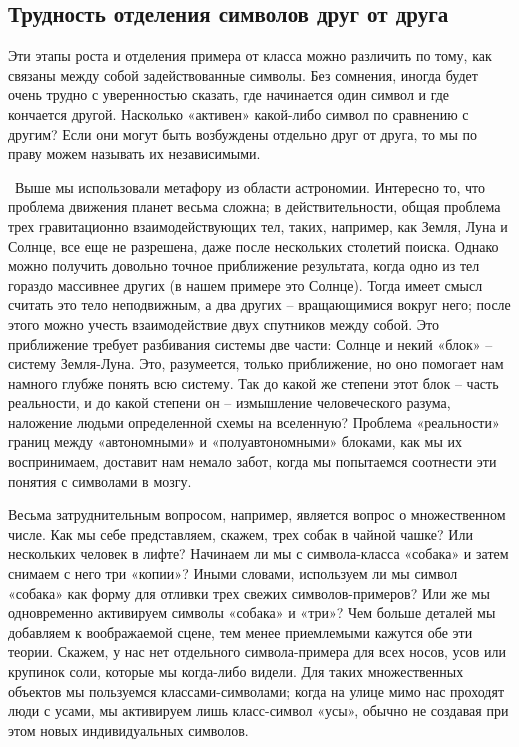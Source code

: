 \documentclass[../main.tex]{subfiles}
\begin{document}
\subsection{Трудность отделения символов друг от друга}

Эти этапы роста и отделения примера от класса можно различить по тому, как связаны между собой задействованные символы. Без сомнения, иногда будет очень трудно с уверенностью сказать, где начинается один символ и где кончается другой. Насколько «активен» какой-либо символ по сравнению с другим? Если они могут быть возбуждены отдельно друг от друга, то мы по праву можем называть их независимыми.

~Выше мы использовали метафору из области астрономии. Интересно то, что проблема движения планет весьма сложна; в действительности, общая проблема трех гравитационно взаимодействующих тел, таких, например, как Земля, Луна и Солнце, все еще не разрешена, даже после нескольких столетий поиска. Однако можно получить довольно точное приближение результата, когда одно из тел гораздо массивнее других (в нашем примере это Солнце). Тогда имеет смысл считать это тело неподвижным, а два других \--- вращающимися вокруг него; после этого можно учесть взаимодействие двух спутников между собой. Это приближение требует разбивания системы две части: Солнце и некий «блок» \--- систему Земля-Луна. Это, разумеется, только приближение, но оно помогает нам намного глубже понять всю систему. Так до какой же степени этот блок \--- часть реальности, и до какой степени он \--- измышление человеческого разума, наложение людьми определенной схемы на вселенную? Проблема «реальности» границ между «автономными» и «полуавтономными» блоками, как мы их воспринимаем, доставит нам немало забот, когда мы попытаемся соотнести эти понятия с символами в мозгу.

Весьма затруднительным вопросом, например, является вопрос о множественном числе. Как мы себе представляем, скажем, трех собак в чайной чашке? Или нескольких человек в лифте? Начинаем ли мы с символа-класса «собака» и затем снимаем с него три «копии»? Иными словами, используем ли мы символ «собака» как форму для отливки трех свежих символов-примеров? Или же мы одновременно активируем символы «собака» и «три»? Чем больше деталей мы добавляем к воображаемой сцене, тем менее приемлемыми кажутся обе эти теории. Скажем, у нас нет отдельного символа-примера для всех носов, усов или крупинок соли, которые мы когда-либо видели. Для таких множественных объектов мы пользуемся классами-символами; когда на улице мимо нас проходят люди с усами, мы активируем лишь класс-символ «усы», обычно не создавая при этом новых индивидуальных символов.
\end{document}
